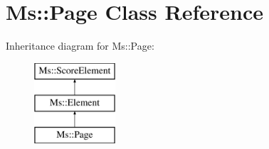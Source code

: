 \hypertarget{class_ms_1_1_page}{}\section{Ms\+:\+:Page Class Reference}
\label{class_ms_1_1_page}
Inheritance diagram for Ms\+:\+:Page\+:\begin{figure}[H]
\begin{center}
\leavevmode
\includegraphics[height=3.000000cm]{class_ms_1_1_page}
\end{center}
\end{figure}
